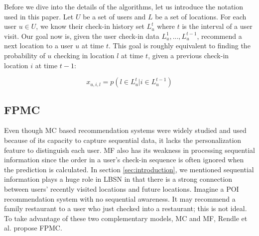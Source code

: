 \documentclass{sig-alternate}
\begin{document}
Before we dive into the details of the algorithms, let us introduce the notation used in this paper. 
Let $U$ be a set of users and $L$ be a set of locations. For each user $u \in U$, 
we know their check-in history set \begin{math}L^t_u\end{math} where $t$ is the interval 
of a user visit. Our goal now is, given the user check-in data 
\begin{math}L^1_u,...,L^{t-1}_u\end{math}, recommend a next location to 
a user $u$ at time $t$. This goal is roughly equivalent to finding the probability of $u$ 
checking in location $l$ at time $t$, given a previous check-in location $i$ at time $t-1$:

\begin{equation}
	x_{u,i,l}=p(l \in L_u^t | i \in L_u^{t-1})
\label{eq:goal}
\end{equation}

\subsection{FPMC}
\label{sec:typeChangesSpecialChars}

Even though MC based recommendation systems were widely studied and used because of 
its capacity to capture sequential data, it lacks the personalization feature to distinguish each user. 
MF also has its weakness in processing sequential information since the order in a user's check-in sequence 
is often ignored when the prediction is calculated.
In section \ref{sec:introduction}, we mentioned sequential information plays a huge role in LBSN 
in that there is a strong connection between users' recently visited locations and future locations. 
Imagine a POI recommendation system with no sequential awareness. 
It may recommend a family restaurant to a user who just checked into a restaurant; this is not ideal. 
To take advantage of these two complementary models, MC and MF, Rendle et al. \cite{Rendle:2010:FPM} propose FPMC.
\end{document}
